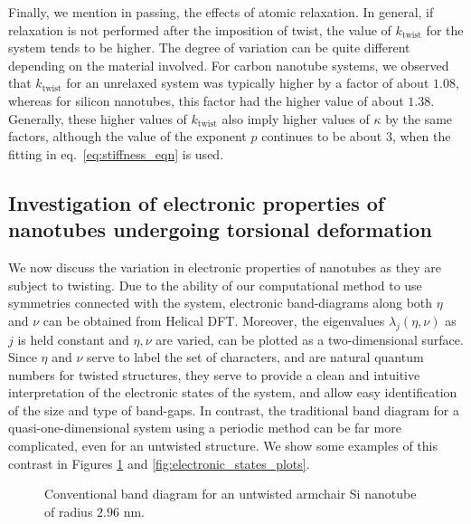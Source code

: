 \documentclass[preprint,12pt, 3p, sort&compress]{elsarticle}
\begin{document}
Finally, we mention in passing, the effects of atomic relaxation. In general, if relaxation is not performed after the imposition of twist, the value of $k_{\text{twist}}$ for the system tends to be higher. The degree of variation can be quite different depending on the material involved. For carbon nanotube systems, we observed that $k_{\text{twist}}$ for an unrelaxed system was typically higher by a factor of about $1.08$, whereas for silicon nanotubes, this factor had the higher value of about $1.38$. Generally, these higher values of $k_{\text{twist}}$ also imply higher values of $\kappa$ by the same factors,  although the value of the exponent $p$ continues to be about $3$, when the fitting in eq.~\ref{eq:stiffness_eqn} is used.
\subsection{Investigation of electronic properties of nanotubes undergoing torsional deformation}
We now discuss the variation in electronic properties of nanotubes as they are subject to twisting. Due to the ability of our computational method to use symmetries connected with the system, electronic band-diagrams along both $\eta$ and $\nu$ can be obtained from Helical DFT. Moreover, the eigenvalues $\lambda_j(\eta,\nu)$ as $j$ is held constant and $\eta, \nu$ are varied, can be plotted as a two-dimensional surface. Since $\eta$ and $\nu$ serve to label the set of characters, and are natural quantum numbers for twisted structures, they serve to provide a clean and intuitive interpretation of the electronic states of the system, and allow easy identification of  the size and type of band-gaps. In contrast, the traditional band diagram for a quasi-one-dimensional system using a periodic method can be far more complicated, even for an untwisted structure. We show some examples of this contrast in Figures \ref{fig:band_diagram_conventional} and \ref{fig:electronic_states_plots}. 
\begin{figure}[ht]
\centering
{}
\caption{Conventional band diagram for an untwisted armchair Si nanotube of radius $2.96$ nm.}
\label{fig:band_diagram_conventional}
\end{figure}
\end{document}

